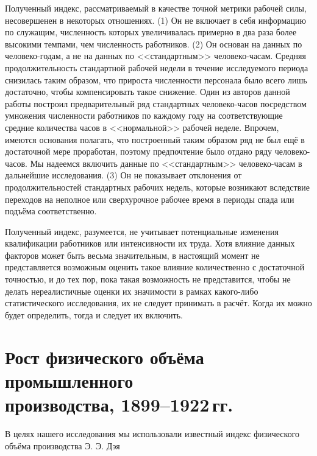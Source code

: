 \documentclass[leqno]{article}  %
\begin{document}
\par
Полученный индекс, рассматриваемый в качестве точной метрики рабочей силы, несовершенен в некоторых отношениях. (1) Он не включает в себя информацию по служащим, численность которых увеличивалась примерно в два раза более высокими темпами, чем численность работников. (2) Он основан на данных по человеко-годам, а не на данных по <<стандартным>> человеко-часам. Средняя продолжительность стандартной рабочей недели в течение исследуемого периода снизилась таким образом, что прироста численности персонала было всего лишь достаточно, чтобы компенсировать такое снижение. Один из авторов данной работы построил предварительный ряд стандартных человеко-часов посредством умножения численности работников по каждому году на соответствующие средние количества часов в <<нормальной>> рабочей неделе. Впрочем, имеются основания полагать, что построенный таким образом ряд не был ещё в достаточной мере проработан, поэтому предпочтение было отдано ряду человеко-часов. Мы надеемся включить данные по <<стандартным>> человеко-часам в дальнейшие исследования. (3) Он не показывает отклонения от продолжительностей стандартных рабочих недель, которые возникают вследствие переходов на неполное или сверхурочное рабочее время в периоды спада или подъёма соответственно.
\par
Полученный индекс, разумеется, не учитывает потенциальные изменения квалификации работников или интенсивности их труда. Хотя влияние данных факторов может быть весьма значительным, в настоящий момент не представляется возможным оценить такое влияние количественно с достаточной точностью, и до тех пор, пока такая возможность не представится, чтобы не делать нереалистичные оценки их значимости в рамках какого-либо статистического исследования, их не следует принимать в расчёт. Когда их можно будет определить, тогда и следует их включить.

\section{Рост физического объёма промышленного \\ производства, 1899--1922\,гг.}

В целях нашего исследования мы использовали известный индекс физического объёма производства Э. Э. Дэя
\par
\end{document}
